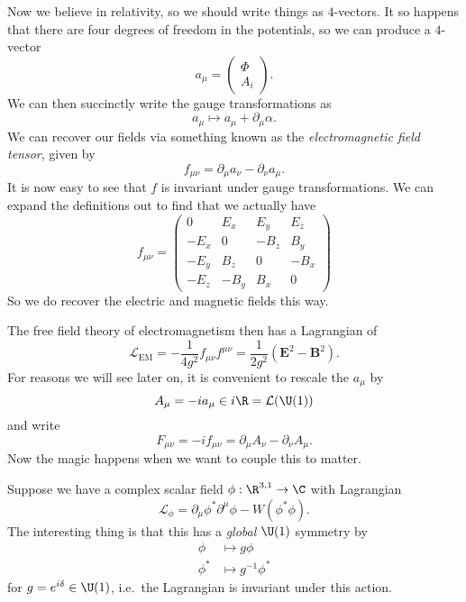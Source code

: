 \documentclass[a4paper]{article}
\begin{document}
Now we believe in relativity, so we should write things as $4$-vectors. It so happens that there are four degrees of freedom in the potentials, so we can produce a $4$-vector
\[
  a_\mu =
  \begin{pmatrix}
    \Phi\\
    A_i
  \end{pmatrix}.
\]
We can then succinctly write the gauge transformations as
\[
  a_\mu \mapsto a_\mu + \partial_\mu \alpha.
\]
We can recover our fields via something known as the \emph{electromagnetic field tensor}, given by
\[
  f_{\mu\nu} = \partial_\mu a_\nu - \partial_\nu a_\mu.
\]
It is now easy to see that $f$ is invariant under gauge transformations. We can expand the definitions out to find that we actually have
\[
  f_{\mu\nu} =
  \begin{pmatrix}
    0 & E_x & E_y & E_z\\
    -E_x & 0 & -B_z & B_y\\
    -E_y & B_z & 0 & -B_x\\
    -E_z & -B_y & B_x & 0
  \end{pmatrix}
\]
So we do recover the electric and magnetic fields this way.

The free field theory of electromagnetism then has a Lagrangian of
\[
  \mathcal{L}_{\mathrm{EM}} = - \frac{1}{4 g^2} f_{\mu\nu} f^{\mu\nu} = \frac{1}{2g^2}(\mathbf{E}^2 - \mathbf{B}^2).
\]
For reasons we will see later on, it is convenient to rescale the $a_\mu$ by
\[
  A_\mu = -i a_\mu \in i\R = \mathcal{L}(\U(1))
\]
and write
\[
  F_{\mu\nu}=-if_{\mu\nu}=\partial_\mu A_\nu-\partial_\nu A_\mu.
\]
Now the magic happens when we want to couple this to matter.

Suppose we have a complex scalar field $\phi: \R^{3, 1} \to \C$ with Lagrangian
\[
  \mathcal{L}_\phi = \partial_\mu \phi^* \partial^\mu \phi - W(\phi^* \phi).
\]
The interesting thing is that this has a \emph{global} $\U(1)$ symmetry by
\begin{align*}
  \phi &\mapsto g \phi\\
  \phi^* &\mapsto g^{-1}\phi^*
\end{align*}
for $g = e^{i\delta} \in \U(1)$, i.e.\ the Lagrangian is invariant under this action.
\end{document}
